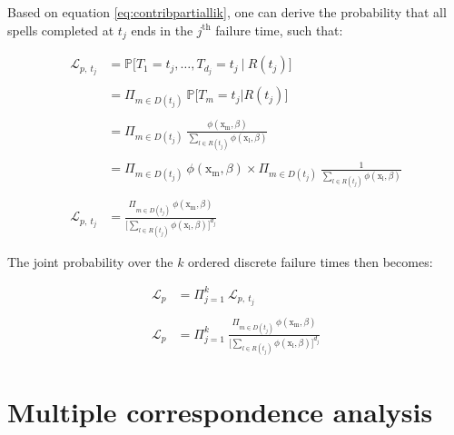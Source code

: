\documentclass[
]{book}
\begin{document}
Based on equation \eqref{eq:contribpartiallik}, one can derive the probability that all spells completed at \(t_j\) ends in the \(j^{\text{th}}\) failure time, such that:

\begin{equation}
\begin{aligned}
  \mathcal{L}_{p,\ t_j} & = \mathbb{P}\big[T_1 = t_j, \dots, T_{d_j} = t_j \ | \ R(t_j)\big] \\\\
  & = \Pi_{m \in D(t_j)} \ \mathbb{P}\big[T_m = t_j | R(t_j) \big] \\\\
  & = \Pi_{m \in D(t_j)} \ \frac{\phi(\mathrm{x_m}, \beta)}{\sum_{l \in R(t_j)} \phi(\mathrm{x_l}, \beta)} \\\\
  & = \Pi_{m \in D(t_j)} \ \phi(\mathrm{x_m}, \beta) \times \Pi_{m \in D(t_j)} \ \frac{1}{\sum_{l \in R(t_j)} \phi(\mathrm{x_l}, \beta)} \\\\
  \mathcal{L}_{p,\ t_j} & = \frac{\Pi_{m \in D(t_j)} \ \phi(\mathrm{x_m}, \beta)}{\Big[\sum_{l \in R(t_j)} \phi(\mathrm{x_l}, \beta)\Big]^{d_j}}
\end{aligned}
\label{eq:partlikproof}
\end{equation}

The joint probability over the \(k\) ordered discrete failure times then becomes:

\begin{equation}
\begin{aligned}
  \mathcal{L}_p & = \Pi_{j=1}^{k} \ \mathcal{L}_{p,\ t_j} \\\\
  \mathcal{L}_p & = \Pi_{j=1}^{k} \ \frac{\Pi_{m \in D(t_j)} \ \phi(\mathrm{x_m}, \beta)}{\Big[\sum_{l \in R(t_j)} \phi(\mathrm{x_l}, \beta)\Big]^{d_j}}
\end{aligned}
\label{eq:partlikproofbis}
\end{equation}

\hypertarget{mcaappendix}{%
\section*{Multiple correspondence analysis}\label{mcaappendix}}
\end{document}
